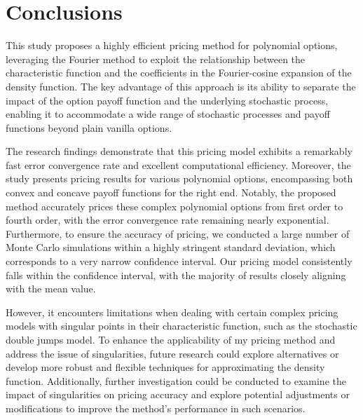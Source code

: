 \chapter{Conclusions}
This study proposes a highly efficient pricing method for polynomial options, leveraging the Fourier method to exploit the relationship between the characteristic function and the coefficients in the Fourier-cosine expansion of the density function. The key advantage of this approach is its ability to separate the impact of the option payoff function and the underlying stochastic process, enabling it to accommodate a wide range of stochastic processes and payoff functions beyond plain vanilla options.

The research findings demonstrate that this pricing model exhibits a remarkably fast error convergence rate and excellent computational efficiency. Moreover, the study presents pricing results for various polynomial options, encompassing both convex and concave payoff functions for the right end. Notably, the proposed method accurately prices these complex polynomial options from first order to fourth order, with the error convergence rate remaining nearly exponential. Furthermore, to ensure the accuracy of pricing, we conducted a large number of Monte Carlo simulations within a highly stringent standard deviation, which corresponds to a very narrow confidence interval. Our pricing model consistently falls within the confidence interval, with the majority of results closely aligning with the mean value.

However, it encounters limitations when dealing with certain complex pricing models with singular points in their characteristic function, such as the stochastic double jumps model. To enhance the applicability of my pricing method and address the issue of singularities, future research could explore alternatives or develop more robust and flexible techniques for approximating the density function. Additionally, further investigation could be conducted to examine the impact of singularities on pricing accuracy and explore potential adjustments or modifications to improve the method's performance in such scenarios.

